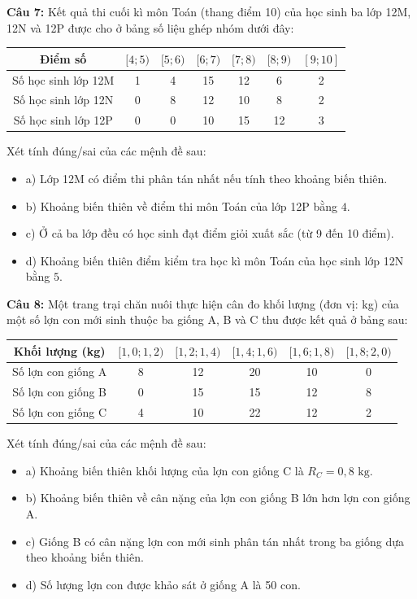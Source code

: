 \documentclass[12pt]{article}
\begin{document}
	\vspace{4mm}
	
	\noindent \textbf{Câu 7:} Kết quả thi cuối kì môn Toán (thang điểm 10) của học sinh ba lớp 12M, 12N và 12P được cho ở bảng số liệu ghép nhóm dưới đây:
	\begin{center}
		\renewcommand{\arraystretch}{1.3}
		\begin{tabular}{|c|c|c|c|c|c|c|}
			\hline
			Điểm số & $[4; 5)$ & $[5; 6)$ & $[6; 7)$ & $[7; 8)$ & $[8; 9)$ & $[9; 10]$ \\
			\hline
			Số học sinh lớp 12M & 1 & 4 & 15 & 12 & 6 & 2 \\
			\hline
			Số học sinh lớp 12N & 0 & 8 & 12 & 10 & 8 & 2 \\
			\hline
			Số học sinh lớp 12P & 0 & 0 & 10 & 15 & 12 & 3 \\
			\hline
		\end{tabular}
	\end{center}
	Xét tính đúng/sai của các mệnh đề sau:
	\begin{itemize}[label=, leftmargin=*]
		\item  a) Lớp 12M có điểm thi phân tán nhất nếu tính theo khoảng biến thiên.
		\item  b) Khoảng biến thiên về điểm thi môn Toán của lớp 12P bằng $4$.
		\item  c) Ở cả ba lớp đều có học sinh đạt điểm giỏi xuất sắc (từ 9 đến 10 điểm).
		\item  d) Khoảng biến thiên điểm kiểm tra học kì môn Toán của học sinh lớp 12N bằng $5$.
	\end{itemize}
	
	\vspace{4mm}
	
	\noindent \textbf{Câu 8:} Một trang trại chăn nuôi thực hiện cân đo khối lượng (đơn vị: kg) của một số lợn con mới sinh thuộc ba giống A, B và C thu được kết quả ở bảng sau:
	\begin{center}
		\renewcommand{\arraystretch}{1.3}
		\begin{tabular}{|c|c|c|c|c|c|}
			\hline
			Khối lượng (kg) & $[1,0; 1,2)$ & $[1,2; 1,4)$ & $[1,4; 1,6)$ & $[1,6; 1,8)$ & $[1,8; 2,0)$ \\
			\hline
			Số lợn con giống A & 8 & 12 & 20 & 10 & 0 \\
			\hline
			Số lợn con giống B & 0 & 15 & 15 & 12 & 8 \\
			\hline
			Số lợn con giống C & 4 & 10 & 22 & 12 & 2 \\
			\hline
		\end{tabular}
	\end{center}
	Xét tính đúng/sai của các mệnh đề sau:
	\begin{itemize}[label=, leftmargin=*]
		\item  a) Khoảng biến thiên khối lượng của lợn con giống C là $R_C = 0,8\text{ kg}$.
		\item  b) Khoảng biến thiên về cân nặng của lợn con giống B lớn hơn lợn con giống A.
		\item  c) Giống B có cân nặng lợn con mới sinh phân tán nhất trong ba giống dựa theo khoảng biến thiên.
		\item  d) Số lượng lợn con được khảo sát ở giống A là 50 con.
	\end{itemize}
	
\end{document}
